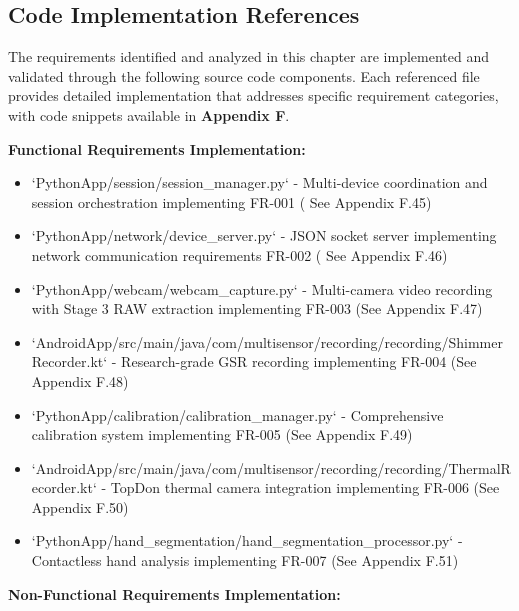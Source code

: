 \documentclass[11pt,a4paper]{report}
\begin{document}
\subsection{Code Implementation References}

The requirements identified and analyzed in this chapter are implemented and validated through the following source code
components. Each referenced file provides detailed implementation that addresses specific requirement categories, with
code snippets available in \textbf{Appendix F}.

\textbf{Functional Requirements Implementation:}

\begin{itemize}
\item `PythonApp/session/session_manager.py` - Multi-device coordination and session orchestration implementing FR-001 (
  See Appendix F.45)
\item `PythonApp/network/device_server.py` - JSON socket server implementing network communication requirements FR-002 (
  See Appendix F.46)
\item `PythonApp/webcam/webcam_capture.py` - Multi-camera video recording with Stage 3 RAW extraction implementing
  FR-003 (See Appendix F.47)
\item `AndroidApp/src/main/java/com/multisensor/recording/recording/ShimmerRecorder.kt` - Research-grade GSR recording
  implementing FR-004 (See Appendix F.48)
\item `PythonApp/calibration/calibration_manager.py` - Comprehensive calibration system implementing FR-005 (See
  Appendix F.49)
\item `AndroidApp/src/main/java/com/multisensor/recording/recording/ThermalRecorder.kt` - TopDon thermal camera integration
  implementing FR-006 (See Appendix F.50)
\item `PythonApp/hand_segmentation/hand_segmentation_processor.py` - Contactless hand analysis implementing FR-007 (See
  Appendix F.51)

\end{itemize}
\textbf{Non-Functional Requirements Implementation:}
\end{document}
